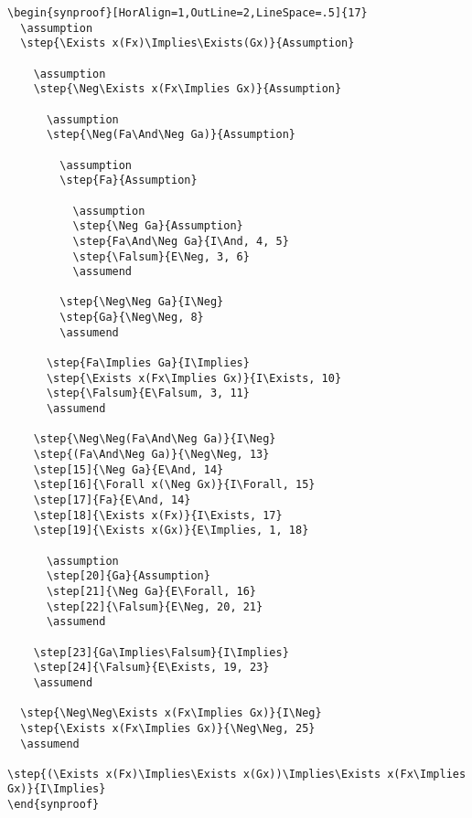 \documentclass{article}
\begin{document}
\pagebreak
\begin{verbatim}
\begin{synproof}[HorAlign=1,OutLine=2,LineSpace=.5]{17}
  \assumption
  \step{\Exists x(Fx)\Implies\Exists(Gx)}{Assumption}
		
    \assumption
    \step{\Neg\Exists x(Fx\Implies Gx)}{Assumption}
		
      \assumption
      \step{\Neg(Fa\And\Neg Ga)}{Assumption}
						
        \assumption
        \step{Fa}{Assumption}
		
          \assumption
          \step{\Neg Ga}{Assumption}
          \step{Fa\And\Neg Ga}{I\And, 4, 5}
          \step{\Falsum}{E\Neg, 3, 6}
          \assumend
		
        \step{\Neg\Neg Ga}{I\Neg}
        \step{Ga}{\Neg\Neg, 8}
        \assumend
		
      \step{Fa\Implies Ga}{I\Implies}
      \step{\Exists x(Fx\Implies Gx)}{I\Exists, 10}
      \step{\Falsum}{E\Falsum, 3, 11}
      \assumend
		
    \step{\Neg\Neg(Fa\And\Neg Ga)}{I\Neg}
    \step{(Fa\And\Neg Ga)}{\Neg\Neg, 13}
    \step[15]{\Neg Ga}{E\And, 14}
    \step[16]{\Forall x(\Neg Gx)}{I\Forall, 15}
    \step[17]{Fa}{E\And, 14}
    \step[18]{\Exists x(Fx)}{I\Exists, 17}
    \step[19]{\Exists x(Gx)}{E\Implies, 1, 18}
		
      \assumption
      \step[20]{Ga}{Assumption}
      \step[21]{\Neg Ga}{E\Forall, 16}
      \step[22]{\Falsum}{E\Neg, 20, 21}
      \assumend
		
    \step[23]{Ga\Implies\Falsum}{I\Implies}
    \step[24]{\Falsum}{E\Exists, 19, 23}
    \assumend
	
  \step{\Neg\Neg\Exists x(Fx\Implies Gx)}{I\Neg}
  \step{\Exists x(Fx\Implies Gx)}{\Neg\Neg, 25}
  \assumend

\step{(\Exists x(Fx)\Implies\Exists x(Gx))\Implies\Exists x(Fx\Implies Gx)}{I\Implies}
\end{synproof}
\end{verbatim}
\end{document}
